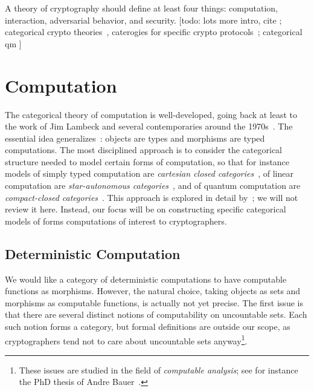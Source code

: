 A theory of cryptography should define at least four things: computation,
interaction, adversarial behavior, and security. [todo: lots more intro,
cite \cite{broadbent-karvonen-2022};
categorical crypto theories~\cite{hines-2020,pavlovic-2012,pavlovic-2014,stay-vicary-2013},
caterogies for specific crypto protocols~\cite{bkm-2019, bmr-2019}; categorical
qm
\cite{abramsky-coecke-2004,coecke-perdrix-2012,heunen-vicary-2014,coecke-kissinger-2017,chitambar-gour-2019}]

\section{Computation}

The categorical theory of computation is well-developed, going back at least to
the work of Jim Lambeck and several contemporaries around the
1970s~\cite{lambeck-1974,lambeck-1980,lawvere-1969,seely-1984}. The essential
idea generalizes~: objects are types
and morphisms are typed computations. The most disciplined approach is to
consider the categorical structure needed to model certain forms of computation, so that
for instance models of simply typed computation are \emph{cartesian closed
categories}~\cite{lambeck-1974}, of linear computation are \emph{star-autonomous
categories}~\cite{seely-1989}, and of quantum computation are \emph{compact-closed
categories}~\cite{abramsky-coecke-2004}. This approach is explored in detail
by~\cite{crole-1994}; we will not review it here. Instead, our focus will be on
constructing specific categorical models of forms computations of interest to
cryptographers.

\subsection{Deterministic Computation}

We would like a category of deterministic computations to have computable functions
as morphisms. However, the natural choice, taking objects as sets and morphisms
as computable functions, is actually not yet precise. The first issue is that
there are several distinct notions of computability on uncountable sets. Each
such notion forms a category, but formal definitions are outside our scope, as
cryptographers tend not to care about uncountable sets anyway\footnote{These
  issues are studied in the field of \emph{computable analysis}; see for
instance the PhD thesis of Andre Bauer~\cite{bauer-2000}.}.

